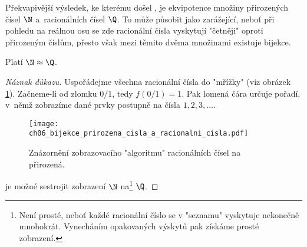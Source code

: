 Překvapivější výsledek, ke kterému došel , je ekvipotence množiny přirozených čísel $\N$ a~racionálních čísel $\Q$. To může působit jako zarážející, neboť při pohledu na reálnou osu se zde racionální čísla vyskytují "četněji" oproti přirozeným číslům, přesto však mezi těmito dvěma množinami existuje bijekce.
\begin{theorem}\label{thm:N_a_Q}
    Platí $\N\approx\Q$.
\end{theorem}
\begin{proof}[Náznak důkazu]
    Uspořádejme všechna racionální čísla do "mřížky" (viz obrázek \ref{fig:bijekce_prirozena_cisla_a_racionalni_cisla}). Začneme-li od zlomku $0/1$, tedy $f(0/1)=1$. Pak lomená čára určuje pořadí, v~němž zobrazíme dané prvky postupně na čísla $1,2,3,\dots$.
    \begin{figure}[H]
        \centering
        \texttt{[image: ch06\_bijekce\_prirozena\_cisla\_a\_racionalni\_cisla.pdf]}
        \caption{Znázornění zobrazovacího "algoritmu" racionálních čísel na přirozená.}
        \label{fig:bijekce_prirozena_cisla_a_racionalni_cisla}
    \end{figure}
    je možné sestrojit zobrazení $\N$ na\footnote{Není prosté, neboť každé racionální číslo se v "seznamu" vyskytuje nekonečně mnohokrát. Vynecháním opakovaných výskytů pak získáme prosté zobrazení.} $\Q$.
\end{proof}
\medskip

